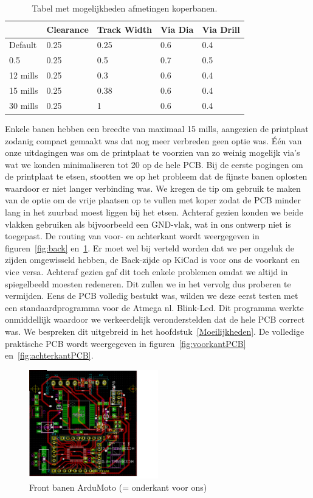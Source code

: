\begin {table}[H]
\caption {Tabel met mogelijkheden afmetingen koperbanen.} \label{table:afmetingen}
	\begin{center}
	\begin{tabular}{ | l | l | l | l | l |}
	\hline
	  & Clearance & Track Width & Via Dia & Via Drill\\ \hline
	Default & 0.25 & 0.25 & 0.6 & 0.4\\ \hline
	0.5 & 0.25 & 0.5 & 0.7 & 0.5 \\ \hline
	12 mills & 0.25 & 0.3 & 0.6 & 0.4 \\ \hline
	15 mills & 0.25 & 0.38 & 0.6 & 0.4 \\ \hline
	30 mills & 0.25 & 1 & 0.6 & 0.4 \\ \hline
	\end{tabular}
	\end{center}
\end{table}
 Enkele banen hebben een breedte van maximaal 15 mills, aangezien de printplaat zodanig compact gemaakt was dat nog meer verbreden geen optie was. \'E\'en van onze uitdagingen was om de printplaat te voorzien van zo weinig mogelijk via's wat we konden minimaliseren tot 20 op de hele PCB. Bij de  eerste pogingen om de printplaat te etsen, stootten we op het probleem dat de fijnste banen oplosten waardoor er niet langer verbinding was. We kregen de tip om gebruik te maken van de optie om de vrije plaatsen op te vullen met koper zodat de PCB minder lang in het zuurbad moest liggen bij het etsen. Achteraf gezien konden we beide vlakken gebruiken als bijvoorbeeld een GND-vlak, wat in ons ontwerp niet is toegepast. De routing van voor- en achterkant wordt weergegeven in figuren~\ref{fig:back} en~\ref{fig:front}. Er moet wel bij verteld worden dat we per ongeluk de zijden omgewisseld hebben, de Back-zijde op KiCad is voor ons de voorkant en vice versa. Achteraf gezien gaf dit toch enkele problemen omdat we altijd in spiegelbeeld moesten redeneren. Dit zullen we in het vervolg dus proberen te vermijden. Eens de PCB volledig bestukt was, wilden we deze eerst testen met een standaardprogramma voor de Atmega nl. Blink-Led. Dit programma werkte onmiddellijk waardoor we verkeerdelijk veronderstelden dat de hele PCB correct was. We bespreken dit uitgebreid in het hoofdstuk~\ref{Moeilijkheden}. De volledige praktische PCB wordt weergegeven in figuren~\ref{fig:voorkantPCB} en~\ref{fig:achterkantPCB}. 
\begin{figure}[h]
\centering
\includegraphics[width=0.5\textwidth]{Front.png}
\caption{Front banen ArduMoto (= onderkant voor ons)}
\label{fig:front}
\end{figure}

